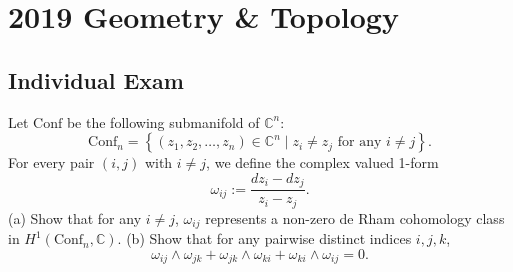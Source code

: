\section{2019 Geometry \& Topology}

\subsection{Individual Exam}

\begin{exercise}
\label{geometry:2019:1}
Let $\mathrm{Conf}$ be the following submanifold of $\mathbb{C}^{n}$:
\[
\mathrm{Conf}_{n} = \left\{\left(z_{1}, z_{2}, \dots, z_{n}\right) \in \mathbb{C}^{n} \mid z_{i} \neq z_{j} \text{ for any } i \neq j \right\}.
\]
For every pair $(i, j)$ with $i \neq j$, we define the complex valued 1-form
\[
\omega_{ij} := \frac{dz_{i} - dz_{j}}{z_{i} - z_{j}}.
\]
(a) Show that for any $i \neq j$, $\omega_{ij}$ represents a non-zero de Rham cohomology class in $H^{1}(\mathrm{Conf}_{n}, \mathbb{C})$.
(b) Show that for any pairwise distinct indices $i, j, k$,
\[
\omega_{ij} \wedge \omega_{jk} + \omega_{jk} \wedge \omega_{ki} + \omega_{ki} \wedge \omega_{ij} = 0.
\]
\end{exercise}

